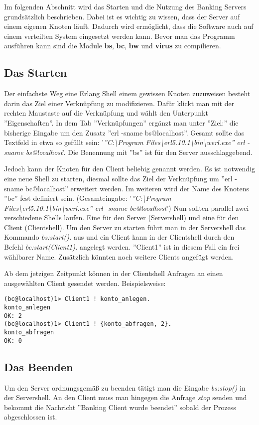 
Im folgenden Abschnitt wird das Starten und die Nutzung des Banking Servers grundsätzlich beschrieben. Dabei ist es wichtig zu wissen, dass der Server auf einem eigenen Knoten läuft. Dadurch wird ermöglicht, dass die Software auch auf einem verteilten System eingesetzt werden kann. Bevor man das Programm ausführen kann sind die Module \textbf{bs}, \textbf{bc}, \textbf{bw} und \textbf{virus} zu compilieren.

\subsection{Das Starten}

Der einfachste Weg eine Erlang Shell einem gewissen Knoten zuzuweisen besteht darin das Ziel einer Verknüpfung zu modifizieren. Dafür klickt man mit der rechten Maustaste auf die Verknüpfung und wählt den Unterpunkt ''Eigenschaften''.  In dem Tab ''Verknüpfungen'' ergänzt man unter ''Ziel:'' die bisherige Eingabe um den Zusatz ''erl -sname bs@localhost''. Gesamt sollte das Textfeld in etwa so gefüllt sein: '\textit{''C:\textbackslash Program Files\textbackslash erl5.10.1\textbackslash bin\textbackslash werl.exe'' erl -sname bs@localhost}'. Die Benennung mit ''bs'' ist für den Server ausschlaggebend.

Jedoch kann der Knoten für den Client beliebig genannt werden. Es ist notwendig eine neue Shell zu starten, diesmal sollte das Ziel der Verknüpfung um ''erl -sname bc@localhost'' erweitert werden. Im weiteren wird der Name des Knotens ''bc'' fest definiert sein. (Gesamteingabe: '\textit{''C:\textbackslash Program Files\textbackslash erl5.10.1\textbackslash bin\textbackslash werl.exe'' erl -sname bc@localhost}') Nun sollten parallel zwei verschiedene Shells laufen. Eine für den Server (Servershell) und eine für den Client (Clientshell). Um den Server zu starten führt man in der Servershell das Kommando \textit{bs:start().} aus und ein Client kann in der Clientshell durch den Befehl \textit{bc:start(Client1).} angelegt werden. ''Client1'' ist in diesem Fall ein frei wählbarer Name. Zusätzlich könnten noch weitere Clients angefügt werden.

Ab dem jetzigen Zeitpunkt können in der Clientshell Anfragen an einen ausgewählten Client gesendet werden. Beispielsweise:

\begin{lstlisting} 
(bc@localhost)1> Client1 ! konto_anlegen.
konto_anlegen
OK: 2
(bc@localhost)1> Client1 ! {konto_abfragen, 2}.
konto_abfragen
OK: 0
\end{lstlisting}

\subsection{Das Beenden}

Um den Server ordnungsgemäß zu beenden tätigt man die Eingabe \textit{bs:stop()} in der Servershell. An den Client muss man hingegen die Anfrage \textit{stop} senden und bekommt die Nachricht ''Banking Client wurde beendet'' sobald der Prozess abgeschlossen ist.